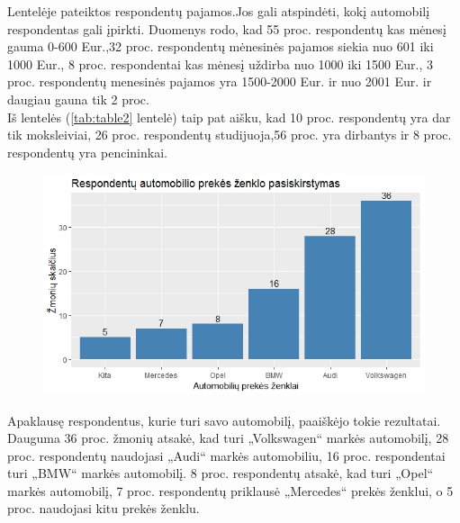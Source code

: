 \documentclass[12pt,titlepage]{article}
\begin{document}
Lentelėje pateiktos respondentų pajamos.Jos gali atspindėti, kokį automobilį respondentas gali įpirkti. Duomenys rodo, kad 55 proc. respondentų kas mėnesį gauma 0-600 Eur.,32 proc. respondentų mėnesinės pajamos siekia nuo 601 iki 1000 Eur., 8 proc. respondentai kas mėnesį uždirba nuo 1000 iki 1500 Eur., 3 proc. respondentų menesinės pajamos yra 1500-2000 Eur. ir nuo 2001 Eur. ir daugiau gauna tik 2 proc. \\

Iš lentelės (\ref{tab:table2} lentelė) taip pat aišku, kad 10 proc. respondentų yra dar tik moksleiviai, 26 proc.  respondentų studijuoja,56 proc. yra dirbantys ir 8 proc. respondentų yra pencininkai. \\
 
\begin{figure}[H]
\center
\includegraphics[scale=0.8]{plot1}
\end{figure}
 
Apaklausę respondentus, kurie turi savo automobilį, paaiškėjo tokie rezultatai.  Dauguma 36 proc. žmonių atsakė, kad turi „Volkswagen“ markės automobilį, 28 proc. respondentų naudojasi „Audi“ markės automobiliu, 16 proc. respondentai turi „BMW“ markės automobilį. 8 proc. respondentų atsakė, kad turi „Opel“  markės automobilį, 7 proc. respondentų priklausė „Mercedes“ prekės ženklui, o 5 proc. naudojasi kitu prekės ženklu. \\
\end{document}
